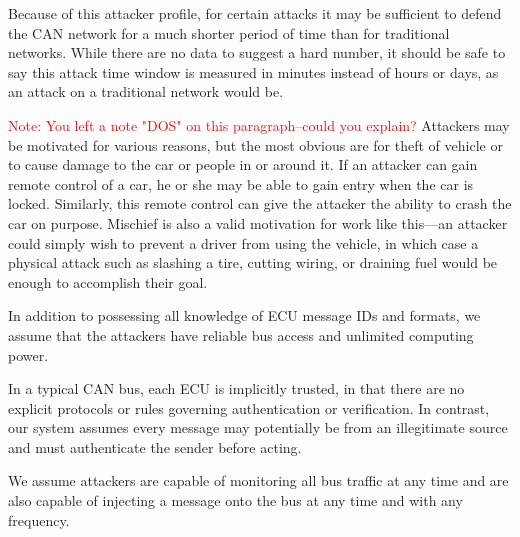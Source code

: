 Because of this attacker profile, for certain attacks it may be sufficient to defend the CAN network for a much shorter period of time than for traditional networks. While there are no data to suggest a hard number, it should be safe to say this attack time window is measured in minutes instead of hours or days, as an attack on a traditional network would be. 



\textcolor{red}{Note: You left a note "DOS" on this paragraph--could you explain?}
Attackers may be motivated for various reasons, but the most obvious are for theft of vehicle or to cause damage to the car or people in or around it. If an attacker can gain remote control of a car, he or she may be able to gain entry when the car is locked. Similarly, this remote control can give the attacker the ability to crash the car on purpose. Mischief is also a valid motivation for work like this---an attacker could simply wish to prevent a driver from using the vehicle, in which case a physical attack such as slashing a tire, cutting wiring, or draining fuel would be enough to accomplish their goal.

In addition to possessing all knowledge of ECU message IDs and formats, we assume that the attackers have reliable bus access and unlimited computing power.


In a typical CAN bus, each ECU is implicitly trusted, in that there are no explicit protocols or rules governing authentication or verification. In contrast, our system assumes every message may potentially be from an illegitimate source and must authenticate the sender before acting. 

We assume attackers are capable of monitoring all bus traffic at any time and are also capable of injecting a message onto the bus at any time and with any frequency.